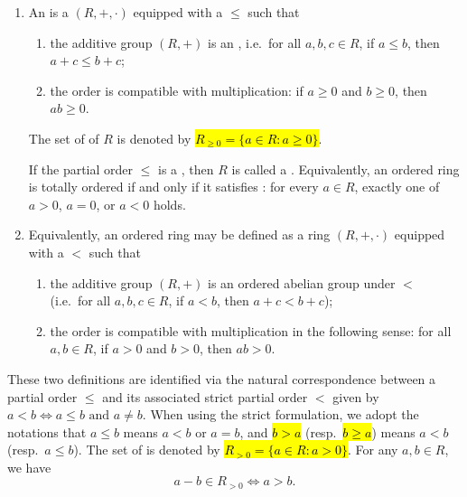 \begin{definition} \label{definition:ordered_ring}
    \begin{enumerate}
        \item An  is a  $(R,+,\cdot)$ equipped with a  $\leq$ such that
        \begin{enumerate}
            \item the additive group $(R,+)$ is an , i.e.\ for all $a,b,c \in R$, if $a \leq b$, then $a + c \leq b + c$;
            \item the order is compatible with multiplication: if $a \geq 0$ and $b \geq 0$, then $ab \geq 0$.
        \end{enumerate}
        The set of  of $R$ is denoted by \hl{$R_{\ge 0} = \{a \in R : a \ge 0\}$}.

        If the partial order $\leq$ is a , then $R$ is called a . 
        Equivalently, an ordered ring is totally ordered if and only if it satisfies : for every $a \in R$, exactly one of $a > 0$, $a = 0$, or $a < 0$ holds.

        \item Equivalently, an ordered ring may be defined as a ring $(R,+,\cdot)$ equipped with a  $<$ such that
        \begin{enumerate}
            \item the additive group $(R,+)$ is an ordered abelian group under $<$ (i.e.\ for all $a,b,c \in R$, if $a < b$, then $a + c < b + c$);
            \item the order is compatible with multiplication in the following sense: for all $a,b \in R$, if $a > 0$ and $b > 0$, then $ab > 0$.
        \end{enumerate}
    \end{enumerate}

    These two definitions are identified via the natural correspondence between a partial order $\leq$ and its associated strict partial order $<$ given by $a < b \iff a \leq b \text{ and } a \neq b$. When using the strict formulation, we adopt the notations that $a \leq b$ means $a < b$ or $a = b$, and \hl{$b > a$} (resp.\ \hl{$b \geq a$}) means $a < b$ (resp.\ $a \leq b$). The set of  is denoted by \hl{$R_{> 0} = \{a \in R : a > 0\}$}. For any $a,b \in R$, we have
    $$a - b \in R_{> 0} \iff a > b.$$
\end{definition}
